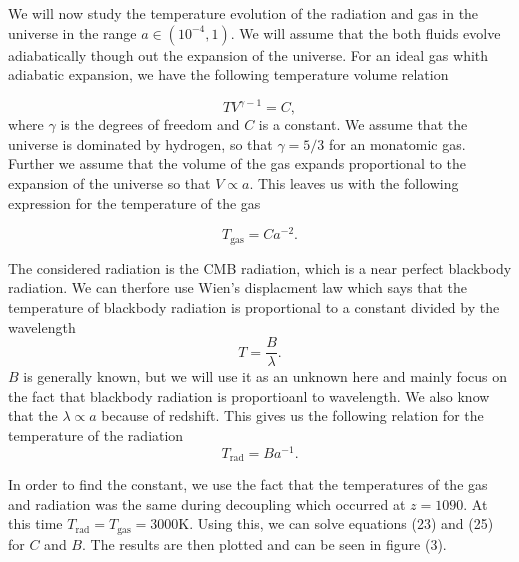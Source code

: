 \documentclass[a4paper]{article}
\begin{document}
We will now study the temperature evolution of the radiation and gas in the universe in the range $a \in (10^{-4},1)$. We will assume that the both fluids evolve adiabatically though out the expansion of the universe. For an ideal gas whith adiabatic expansion, we have the following temperature volume relation

\begin{equation}
    TV^{\gamma-1} = C,
\end{equation}
where $\gamma$ is the degrees of freedom and $C$ is a constant. We assume that the universe is dominated by hydrogen, so that $\gamma = 5/3$ for an monatomic gas. Further we assume that the volume of the gas expands proportional to the expansion of the universe so that $V \propto a$. This leaves us with the following expression for the temperature of the gas

\begin{equation}
    T_\text{gas} = C a^{-2}.
\end{equation}


The considered radiation is the CMB radiation, which is a near perfect blackbody radiation. We can therfore use Wien's displacment law which says that the temperature of blackbody radiation is proportional to a constant divided by the wavelength
\begin{equation}
    T =  \frac{B}{\lambda}.
\end{equation}
$B$ is generally known, but we will use it as an unknown here and mainly focus on the fact that blackbody radiation is proportioanl to wavelength. We also know that the $\lambda \propto a$ because of redshift. This gives us the following relation for the temperature of the radiation
\begin{equation}
    T_\text{rad} = Ba^{-1}.
\end{equation}

In order to find the constant, we use the fact that the temperatures of the gas and radiation was the same during decoupling which occurred at $z = 1090$. At this time $T_\text{rad} = T_\text{gas} = 3000$K. Using this, we can solve equations (23) and (25) for $C$ and $B$. The results are then plotted and can be seen in figure (3).
\end{document}
